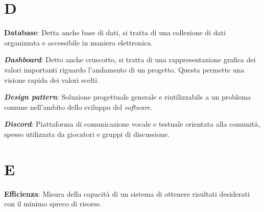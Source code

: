 \documentclass[5pt]{article}
\begin{document}
\pagebreak

\section*{D}
\begin{flushleft}

\textbf{Database}: Detta anche base di dati, si tratta di una collezione di dati organizzata e accessibile in maniera elettronica.\newline

\textbf{\textit{Dashboard}}: Detto anche cruscotto, si tratta di una rappresentazione grafica dei valori importanti riguardo l'andamento di un progetto. Questa permette una visione rapida dei valori scelti.\newline

\textbf{\textit{Design pattern}}: Soluzione progettuale generale e riutilizzabile a un problema comune nell'ambito dello sviluppo del \textit{software}.\newline


\textbf{\textit{Discord}}: Piattaforma di comunicazione vocale e testuale orientata alla comunità, spesso utilizzata da giocatori e gruppi di discussione.\newline


\end{flushleft}

\pagebreak

\section*{E}

\textbf{Efficienza}: Misura della capacità di un sistema di ottenere risultati desiderati con il minimo spreco di risorse.\newline



\pagebreak
\end{document}

